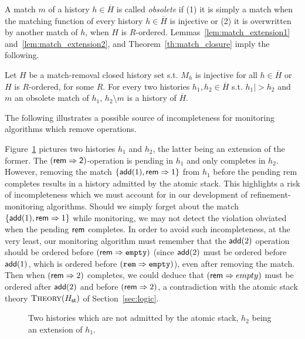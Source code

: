 A match $m$ of a history $h\in  \overline{H}$ is called \emph{obsolete} if (1) it is simply a
match when the matching function of every history $h\in \overline{H}$
is injective or (2) it is overwritten by another match of $h$, when $H$
is $R$-ordered.
Lemmas~\ref{lem:match_extension1} and~\ref{lem:match_extension2},  and 
Theorem~\ref{th:match_closure} imply the following.

\begin{corollary}\label{cor:matching_final}

Let $H$ be a match-removal closed history set 
s.t.
$M_h$ is injective for all $h\in \overline{H}$ or $H$ is $R$-ordered,
for some $R$.
For every two histories $h_1, h_2\in \overline{H}$ s.t. $h_1 |> h_2$ and
$m$ an obsolete match of $h_1$, 
$h_2\setminus m$ is a history of $\overline{H}$.

\end{corollary}

The following illustrates a possible source of incompleteness for monitoring
algorithms which remove operations.

\begin{example}
  \label{ex:removal_no_saturation}

  Figure~\ref{fig:removal_no_saturation} pictures two histories $h_1$ and
  $h_2$, the latter being an extension of the former. The $(\sf rem =>
  2)$-operation is pending in $h_1$ and only completes in $h_2$. However,
  removing the match ${\{ {\sf add}(1), {\sf rem} => 1 \}}$ from $h_1$ before the
  pending {\sf rem} completes results in a history admitted by the atomic
  stack. This highlights a risk of incompleteness which we must account for in
  our development of refinement-monitoring algorithms. Should we simply forget
  about the match ${\{  {\sf add}(1), {\sf rem} => 1 \}}$ while monitoring, we
  may not detect the violation obviated when the pending ${\sf rem}$ completes.
  In order to avoid such incompleteness, at the very least, our monitoring
  algorithm must remember that the ${\sf add}(2)$ operation should be ordered
  before $({\sf rem} => {\tt empty})$ (since ${\sf add}(2)$ must be ordered
  before ${\sf add}(1)$, which is ordered before $({\tt rem} => {\tt empty})$),
  even after removing the match. Then when $({\sf rem} => 2)$ completes, we
  could deduce that $({\sf rem} => empty)$ must be ordered after ${\sf add}(2)$
  and before $({\sf rem} => 2)$, a contradiction with the atomic stack theory
  $\textsc{Theory}(H_{\sf st})$ of Section~\ref{sec:logic}.

\end{example}

\begin{figure}
  
  \caption{Two histories which are not admitted by the atomic stack, $h_2$
  being an extension of $h_1$.}
  \label{fig:removal_no_saturation}
\end{figure}
